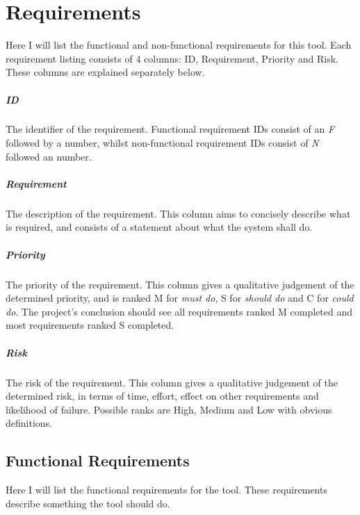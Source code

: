 \chapter{Requirements}

Here I will list the functional and non-functional requirements for this tool.
Each requirement listing consists of 4 columns: ID, Requirement, Priority and Risk.
These columns are explained separately below.

\paragraph{ID}
The identifier of the requirement.
Functional requirement IDs consist of an \emph{F} followed by a number, whilst non-functional requirement IDs consist of \emph{N} followed an number.

\paragraph{Requirement}
The description of the requirement.
This column aims to concisely describe what is required, and consists of a statement about what the system shall do.

\paragraph{Priority}
The priority of the requirement.
This column gives a qualitative judgement of the determined priority, and is ranked M for \emph{must do}, S for \emph{should do} and C for \emph{could do}.
The project's conclusion should see all requirements ranked M completed and most requirements ranked S completed.

\paragraph{Risk}
The risk of the requirement.
This column gives a qualitative judgement of the determined risk, in terms of time, effort, effect on other requirements and likelihood of failure.
Possible ranks are High, Medium and Low with obvious definitions.

\section{Functional Requirements}

Here I will list the functional requirements for the tool.
These requirements describe something the tool should do.

